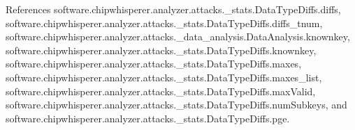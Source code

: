 References software.\+chipwhisperer.\+analyzer.\+attacks.\+\_\+stats.\+Data\+Type\+Diffs.\+diffs, software.\+chipwhisperer.\+analyzer.\+attacks.\+\_\+stats.\+Data\+Type\+Diffs.\+diffs\+\_\+tnum, software.\+chipwhisperer.\+analyzer.\+attacks.\+\_\+data\+\_\+analysis.\+Data\+Analysis.\+knownkey, software.\+chipwhisperer.\+analyzer.\+attacks.\+\_\+stats.\+Data\+Type\+Diffs.\+knownkey, software.\+chipwhisperer.\+analyzer.\+attacks.\+\_\+stats.\+Data\+Type\+Diffs.\+maxes, software.\+chipwhisperer.\+analyzer.\+attacks.\+\_\+stats.\+Data\+Type\+Diffs.\+maxes\+\_\+list, software.\+chipwhisperer.\+analyzer.\+attacks.\+\_\+stats.\+Data\+Type\+Diffs.\+max\+Valid, software.\+chipwhisperer.\+analyzer.\+attacks.\+\_\+stats.\+Data\+Type\+Diffs.\+num\+Subkeys, and software.\+chipwhisperer.\+analyzer.\+attacks.\+\_\+stats.\+Data\+Type\+Diffs.\+pge.


